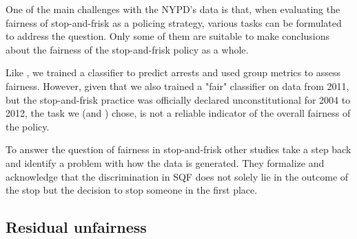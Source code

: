 One of the main challenges with the NYPD's data is that, when evaluating the fairness of stop-and-frisk as a policing strategy, various tasks can be formulated to address the question. Only some of them are suitable to make conclusions about the fairness of the stop-and-frisk policy as a whole.\par
Like \cite{Badr2022DTFANSP}, we trained a classifier to predict arrests and used group metrics to assess fairness. However, given that we also trained a "fair" classifier on data from 2011, but the stop-and-frisk practice was officially declared unconstitutional for 2004 to 2012, the task we (and \cite{Badr2022DTFANSP}) chose, is not a reliable indicator of the overall fairness of the policy.\par
To answer the question of fairness in stop-and-frisk other studies take a step back and identify a problem with how the data is generated. They formalize and acknowledge that the discrimination in SQF does not solely lie in the outcome of the stop but the decision to stop someone in the first place.


\subsection{Residual unfairness}

